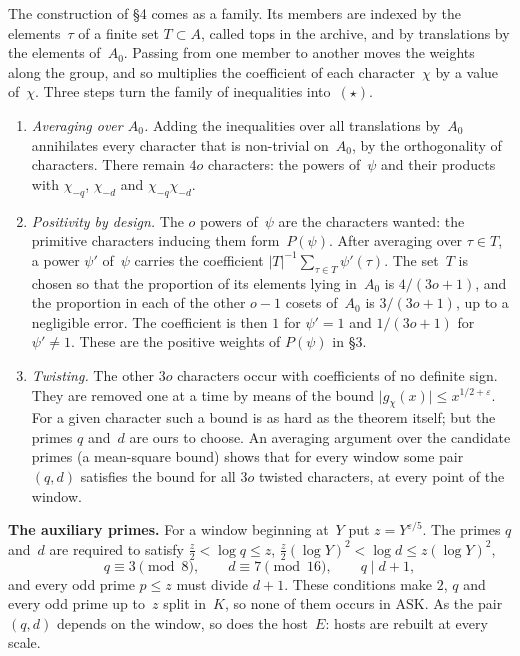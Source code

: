 \documentclass[11pt,a4paper]{article}
\newcommand{\eps}{\varepsilon}
\newcommand{\chid}{\chi_{-d}}
\newcommand{\chiq}{\chi_{-q}}
\newcommand{\kw}[1]{\emph{#1}}
\newcommand{\m}[1]{\mbox{$#1$}}        %
\begin{document}
The construction of §4 comes as a family. Its members are indexed by the elements~$\tau$ of a finite set
\m{T\subset A}, called tops in the archive, and by translations by the elements of~$A_0$. Passing from one member to
another moves the weights along the group, and so multiplies the coefficient of each character~$\chi$ by a value
of~$\chi$. Three steps turn the family of inequalities into~$(\star)$.
\begin{enumerate}[label=\textup{(\roman*)}]
\item \kw{Averaging over $A_0$.} Adding the inequalities over all translations by~$A_0$ annihilates every character
that is non-trivial on~$A_0$, by the orthogonality of characters. There remain $4o$ characters: the powers of~$\psi$
and their products with $\chiq$, $\chid$ and $\chiq\chid$.
\item \kw{Positivity by design.} The $o$ powers of~$\psi$ are the characters wanted: the primitive characters
inducing them form~$P(\psi)$. After averaging over \m{\tau\in T}, a power $\psi'$ of~$\psi$ carries the coefficient
\m{\lvert T\rvert^{-1}\sum_{\tau\in T}\psi'(\tau)}. The set~$T$ is chosen so that the proportion of its elements lying
in~$A_0$ is $4/(3o+1)$, and the proportion in each of the other \m{o-1} cosets of~$A_0$ is $3/(3o+1)$, up to a
negligible error. The coefficient is then $1$ for \m{\psi'=1} and $1/(3o+1)$ for \m{\psi'\ne1}. These are the positive
weights of $P(\psi)$ in §3.
\item \kw{Twisting.} The other $3o$ characters occur with coefficients of no definite sign. They are removed one at a
time by means of the bound \m{\lvert g_\chi(x)\rvert\le x^{1/2+\eps}}. For a given character such a bound is as hard
as the theorem itself; but the primes $q$ and~$d$ are ours to choose. An averaging argument over the candidate primes
(a mean-square bound) shows that for every window some pair $(q,d)$ satisfies the bound for all $3o$ twisted
characters, at every point of the window.
\end{enumerate}

\textbf{The auxiliary primes.} For a window beginning at~$Y$ put \m{z=Y^{\eps/5}}. The primes $q$ and~$d$ are
required to satisfy \m{\frac z2<\log q\le z}, \m{\frac z2(\log Y)^2<\log d\le z(\log Y)^2},
\[
q\equiv3\pmod 8,\qquad d\equiv7\pmod{16},\qquad q\mid d+1,
\]
and every odd prime \m{p\le z} must divide \m{d+1}. These conditions make $2$, $q$ and every odd prime up to~$z$
split in~$K$, so none of them occurs in $\mathrm{ASK}$. As the pair $(q,d)$ depends on the window, so does the host~$E$: hosts are rebuilt at every scale.
\end{document}
